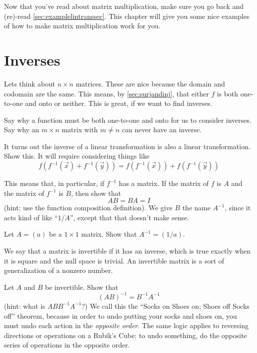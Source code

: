 \begin{Warning}
  Now that you've read about matrix multiplication, make sure you go back and (re)-read  \ref{sec:examplelintranssec}.
  This chapter will give you some nice examples of how to make matrix multiplication work for you.
\end{Warning}

\exersiseso

\section{Inverses}

Lets think about $n\times n$ matrices.
These are nice because the domain and codomain are the same.
This means, by \ref{sec:surjandinj}, that either $f$ is both one-to-one and onto or neither.
This is great, if we want to find inverses.
\begin{EasyEx}
  Say why a function must be both one-to-one and onto for us to consider inverses.
  Say why an $m\times n$ matrix with $m\ne n$ can never have an inverse.
\end{EasyEx}
\begin{Ex}
  It turns out the inverse of a linear transformation is also a linear transformation.
  Show this.
  It will require considering things like
  \[f(f^{-1}(\vec{x})+f^{-1}(\vec{y}))=f(f^{-1}(\vec{x}))+f(f^{-1}(\vec{y}))\]
\end{Ex}
\begin{EasyEx}
  This means that, in particular, if $f^{-1}$ has a matrix.
  If the matrix of $f$ is $A$ and the matrix of $f^{-1}$ is $B$, then show that
  \[AB=BA=I\]
  (hint: use the function composition definition).
  We give $B$ the name $A^{-1}$, since it acts kind of like ``$1/A$'', except that that doesn't make sense.
\end{EasyEx}
\begin{EasyEx}
  Let $A=(a)$ be a $1\times 1$ matrix.
  Show that $A^{-1}=(1/a)$.
\end{EasyEx}
We say that a matrix is invertible if it has an inverse, which is true exactly when it is square and the null space is trivial.  
An invertible matrix is a sort of generalization of a nonzero number.  
\begin{Ex}
  \label{sec:invcontra}
  Let $A$ and $B$ be invertible.
  Show that 
  \[(AB)^{-1}=B^{-1}A^{-1}\]
  (hint: what is $ABB^{-1}A^{-1}$?)
  We call this the ``Socks on Shoes on; Shoes off Socks off'' theorem, because in order to undo putting your socks and shoes on, you must undo each action in the \emph{opposite order}.  
  The same logic applies to reversing directions or operations on a Rubik's Cube: to undo something, do the opposite series of operations in the opposite order.
\end{Ex}
  




